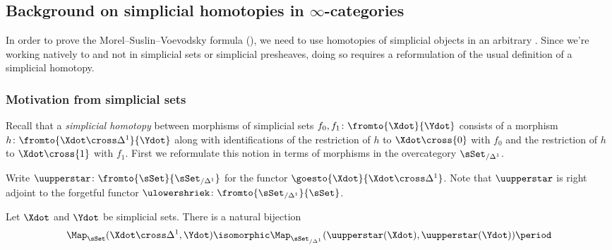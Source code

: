 \subsection{Background on simplicial homotopies in \texorpdfstring{$ \infty $}{∞}-categories}\label{sec:simplicialhomotopy}

In order to prove the Morel--Suslin--Voevodsky formula (), we need to use homotopies of simplicial objects in an arbitrary \category.
Since we're working natively to \categories and not in simplicial sets or simplicial presheaves, doing so requires a reformulation of the usual definition of a simplicial homotopy.


\subsubsection{Motivation from simplicial sets}

Recall that a \textit{simplicial homotopy} between morphisms of simplicial sets $ f_0,f_1 \colon \fromto{\Xdot}{\Ydot} $ consists of a morphism $ h \colon \fromto{\Xdot \cross \Delta^1}{\Ydot} $ along with identifications of the restriction of $ h $ to $ \Xdot \cross \{0\} $ with $ f_0 $ and the restriction of $ h $ to $ \Xdot \cross \{1\} $ with $ f_1 $.
First we reformulate this notion in terms of morphisms in the overcategory $ \sSet_{/\Delta^1} $.

\begin{notation}
	Write $ \uupperstar \colon \fromto{\sSet}{\sSet_{/\Delta^1}} $ for the functor $ \goesto{\Xdot}{\Xdot \cross \Delta^1} $. 
	Note that $ \uupperstar $ is right adjoint to the forgetful functor $ \ulowershriek \colon \fromto{\sSet_{/\Delta^1}}{\sSet} $.
\end{notation}

\begin{lemma}\label{lem:reformshtpy}
	Let $ \Xdot $ and $ \Ydot $ be simplicial sets.
	There is a natural bijection 
	\begin{equation*}
		\Map_{\sSet}(\Xdot \cross \Delta^1,\Ydot) \isomorphic \Map_{\sSet_{/\Delta^1}}(\uupperstar(\Xdot),\uupperstar(\Ydot)) \period 
	\end{equation*}
\end{lemma}

